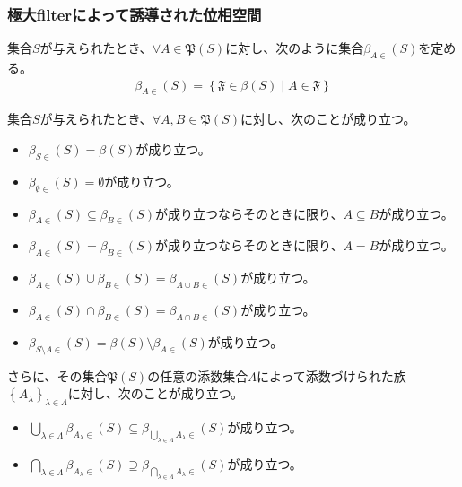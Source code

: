 \documentclass[dvipdfmx]{jsarticle}
\begin{document}
\subsubsection{極大filterによって誘導された位相空間}%
\begin{dfn}
集合$S$が与えられたとき、$\forall A \in \mathfrak{P}(S)$に対し、次のように集合$\beta_{A \in}(S)$を定める。
\begin{align*}
\beta_{A \in}(S) = \left\{ \mathfrak{F \in}\beta(S) \middle| A \in \mathfrak{F} \right\}
\end{align*}
\end{dfn}
\begin{thm}\label{8.1.8.10}
集合$S$が与えられたとき、$\forall A,B \in \mathfrak{P}(S)$に対し、次のことが成り立つ。
\begin{itemize}
\item
  $\beta_{S \in}(S) = \beta(S)$が成り立つ。
\item
  $\beta_{\emptyset \in}(S) = \emptyset$が成り立つ。
\item
  $\beta_{A \in}(S) \subseteq \beta_{B \in}(S)$が成り立つならそのときに限り、$A \subseteq B$が成り立つ。
\item
  $\beta_{A \in}(S) = \beta_{B \in}(S)$が成り立つならそのときに限り、$A = B$が成り立つ。
\item
  $\beta_{A \in}(S) \cup \beta_{B \in}(S) = \beta_{A \cup B \in}(S)$が成り立つ。
\item
  $\beta_{A \in}(S) \cap \beta_{B \in}(S) = \beta_{A \cap B \in}(S)$が成り立つ。
\item
  $\beta_{S \setminus A \in}(S) = \beta(S) \setminus \beta_{A \in}(S)$が成り立つ。
\end{itemize}\par
さらに、その集合$\mathfrak{P}(S)$の任意の添数集合$\varLambda$によって添数づけられた族$\left\{ A_{\lambda} \right\}_{\lambda \in \varLambda}$に対し、次のことが成り立つ。
\begin{itemize}
\item
  $\bigcup_{\lambda \in \varLambda} {\beta_{A_{\lambda} \in}(S)} \subseteq \beta_{\bigcup_{\lambda \in \varLambda} A_{\lambda} \in}(S)$が成り立つ。
\item
  $\bigcap_{\lambda \in \varLambda} {\beta_{A_{\lambda} \in}(S)} \supseteq \beta_{\bigcap_{\lambda \in \varLambda} A_{\lambda} \in}(S)$が成り立つ。
\end{itemize}
\end{thm}
\end{document}
